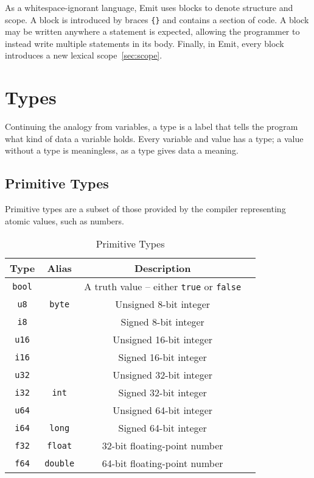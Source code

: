 \documentclass{article}
\begin{document}
    As a whitespace-ignorant language, Emit uses blocks to denote structure and scope.
    A block is introduced by braces \texttt{\{\}} and contains a section of code.
    A block may be written anywhere a statement is expected, allowing the programmer to instead write multiple statements in its body.
    Finally, in Emit, every block introduces a new lexical scope~\ref{sec:scope}.

    \section{Types}\label{sec:types}

    Continuing the analogy from variables, a type is a label that tells the program what kind of data a variable holds.
    Every variable and value has a type; a value without a type is meaningless, as a type gives data a meaning.

    \subsection{Primitive Types}

    Primitive types are a subset of those provided by the compiler representing atomic values, such as numbers.

    \medskip
    \begin{table}[H]
        \begin{tabular}{|c|c|c|l|}
            \hline
            \textbf{Type} & \textbf{Alias} & \textbf{Description} \\
            \hline
            \texttt{bool} & & A truth value -- either \texttt{true} or \texttt{false} \\
            \hline
            \texttt{u8} & \texttt{byte} & Unsigned 8-bit integer \\
            \texttt{i8} & & Signed 8-bit integer \\
            \hline
            \texttt{u16} & & Unsigned 16-bit integer \\
            \texttt{i16} & & Signed 16-bit integer \\
            \hline
            \texttt{u32} & & Unsigned 32-bit integer \\
            \texttt{i32} & \texttt{int} & Signed 32-bit integer \\
            \hline
            \texttt{u64} & & Unsigned 64-bit integer \\
            \texttt{i64} & \texttt{long} & Signed 64-bit integer \\
            \hline
            \texttt{f32} & \texttt{float} & 32-bit floating-point number \\
            \texttt{f64} & \texttt{double} & 64-bit floating-point number \\
            \hline
        \end{tabular}
        \caption{Primitive Types}\label{tab:primitive-types}
    \end{table}
\end{document}

